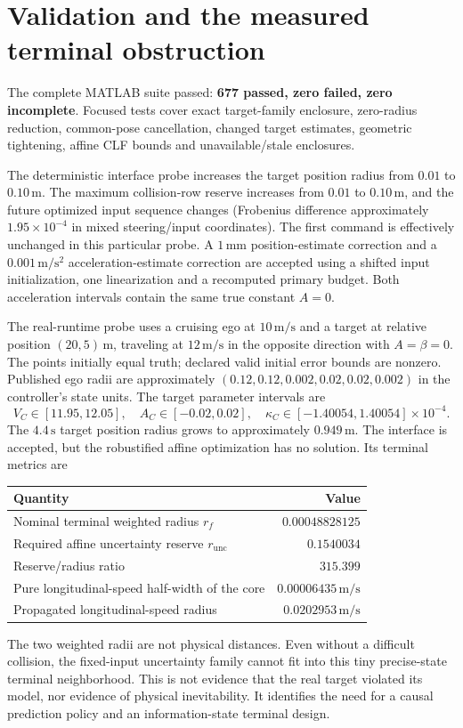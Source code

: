 \documentclass[11pt]{article}
\begin{document}
\section{Validation and the measured terminal obstruction}
The complete MATLAB suite passed: \textbf{677 passed, zero failed, zero
incomplete}. Focused tests cover exact target-family enclosure, zero-radius
reduction, common-pose cancellation, changed target estimates, geometric
tightening, affine CLF bounds and unavailable/stale enclosures.

The deterministic interface probe increases the target position radius from
$0.01$ to $0.10\,\mathrm m$. The maximum collision-row reserve increases from
$0.01$ to $0.10\,\mathrm m$, and the future optimized input sequence changes
(Frobenius difference approximately $1.95\times10^{-4}$ in mixed steering/input
coordinates). The first command is effectively unchanged in this particular
probe. A $1\,\mathrm{mm}$ position-estimate correction and a
$0.001\,\mathrm{m/s^2}$ acceleration-estimate correction are accepted using a
shifted input initialization, one linearization and a recomputed primary
budget. Both acceleration intervals contain the same true constant $A=0$.

The real-runtime probe uses a cruising ego at $10\,\mathrm{m/s}$ and a target
at relative position $(20,5)\,\mathrm m$, traveling at $12\,\mathrm{m/s}$ in
the opposite direction with $A=\beta=0$. The points initially equal truth;
declared valid initial error bounds are nonzero. Published ego radii are
approximately $(0.12,0.12,0.002,0.02,0.02,0.002)$ in the controller's state
units. The target parameter intervals are
\[
 V_C\in[11.95,12.05],\quad A_C\in[-0.02,0.02],\quad
 \kappa_C\in[-1.40054,1.40054]\times10^{-4}.
\]
The $4.4\,\mathrm s$ target position radius grows to approximately
$0.949\,\mathrm m$. The interface is accepted, but the robustified affine
optimization has no solution. Its terminal metrics are
\begin{center}
\begin{tabular}{lr}
\toprule
Quantity & Value\\
\midrule
Nominal terminal weighted radius $r_f$ & $0.00048828125$\\
Required affine uncertainty reserve $r_{\mathrm{unc}}$ & $0.1540034$\\
Reserve/radius ratio & $315.399$\\
Pure longitudinal-speed half-width of the core & $0.00006435\,\mathrm{m/s}$\\
Propagated longitudinal-speed radius & $0.0202953\,\mathrm{m/s}$\\
\bottomrule
\end{tabular}
\end{center}
The two weighted radii are not physical distances. Even without a difficult
collision, the fixed-input uncertainty family cannot fit into this tiny
precise-state terminal neighborhood. This is not evidence that the real target
violated its model, nor evidence of physical inevitability. It identifies the
need for a causal prediction policy and an information-state terminal design.
\end{document}
